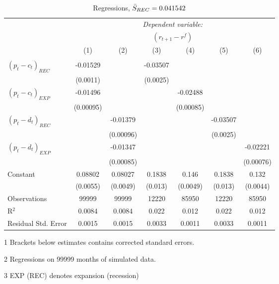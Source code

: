 \begin{table}[H]
\centering   
  \caption{Regressions, $\Bar{S}_{REC} = 0.041542$}           
  \label{tab:regress1}     
  \begin{threeparttable}
\begin{tabular}{@{\hspace{5pt}}l@{\hspace{5pt}}cccccc} 
\toprule 
 & \multicolumn{6}{c}{\textit{Dependent variable:}} \\ 
 & \multicolumn{6}{c}{$\left(r_{t+1}-r^f\right)$} \\ 
 \cmidrule(rr){2-7}
 & (1) & (2) & (3) & (4) & (5) & (6) \\ 
\midrule  
\\[-2.1ex] $\left( p_t - c_t \right)_{REC}$ &-0.01529& &-0.03507 & & &\\ 
  & (0.0011) & &(0.0025) & & & \\ 
 \addlinespace 
  $\left( p_t - c_t \right)_{EXP}$ &-0.01496  &    & &-0.02488 & &  \\ 
  & (0.00095) & & &(0.00085) & & \\ 
 \addlinespace 
  $\left( p_t - d_t \right)_{REC}$ & &-0.01379& & & -0.03507  &   \\ 
                                   & &  (0.00096) & & & (0.0025) &    \\ 
 \addlinespace 
  $\left( p_t - d_t \right)_{EXP}$ & &   -0.01347& & & &-0.02221 \\ 
                                   & &  (0.00085) & & & &(0.00076) \\ 
 \addlinespace 
 Constant &0.08802 &0.08027&0.1838 &0.146 &0.1838 &0.132 \\ 
          &(0.0055) &(0.0049)&(0.013)&(0.0049)&(0.013)&(0.0044) \\ 
 \addlinespace 
\midrule  
Observations & 99999 & 99999&12220 & 85950&12220&85950\\
R$^{2}$ &0.0084 & 0.0084&0.022&0.012&0.022&0.012 \\ 
Residual Std. Error &0.0015 & 0.0015&0.0033&0.0011&0.0033&0.0011 \\ 
\bottomrule 
\end{tabular} 
\begin{tablenotes}
\footnotesize{
\item[1] Brackets below estimates contains \citet{NW87} corrected standard errors. 
\item[2] Regressions on 99999 months of simulated data.
\item[3] EXP (REC) denotes expansion (recession)
}
\end{tablenotes}
\end{threeparttable}
\end{table} 
